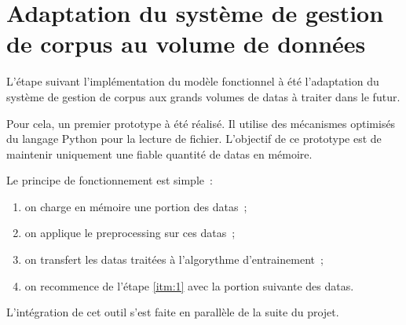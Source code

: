 \section{Adaptation du système de gestion de corpus au volume de données}
L'étape suivant l'implémentation du modèle fonctionnel à été l'adaptation du système de gestion de corpus aux grands volumes de \glspl{data} à traiter dans le futur.

Pour cela, un premier prototype à été réalisé.
Il utilise des mécanismes optimisés du langage Python pour la lecture de fichier.
L'objectif de ce prototype est de maintenir uniquement une fiable quantité de \glspl{data} en mémoire.

Le principe de fonctionnement est simple~:
\begin{enumerate}
	\item on charge en mémoire une portion des \glspl{data}~; \label{itm:1}
	\item on applique le \gls{preprocessing} sur ces \glspl{data}~;
	\item on transfert les \glspl{data} traitées à l'algorythme d'entrainement~;
	\item on recommence de l'étape \ref{itm:1} avec la portion suivante des \glspl{data}.
\end{enumerate}
\vspace{1em}

L'intégration de cet outil s'est faite en parallèle de la suite du projet.